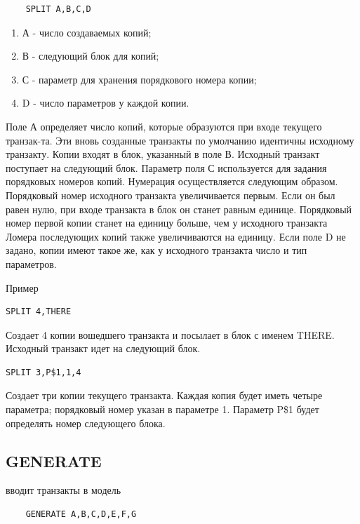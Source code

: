 \documentclass[14pt]{extarticle}
\begin{document}
\begin{lstlisting}
	SPLIT A,B,C,D
\end{lstlisting}

\begin{enumerate}
	\item А - число создаваемых копий;
	\item В - следующий блок для копий;
	\item С - параметр для хранения порядкового номера копии;
	\item D - число параметров у каждой копии.
\end{enumerate}

Поле А определяет число копий, которые образуются при входе текущего транзак-та. Эти вновь созданные транзакты по умолчанию идентичны исходному транзакту. Копии входят в блок, указанный в поле В. Исходный транзакт поступает на следующий блок. Параметр поля С используется для задания порядковых номеров копий. Нумерация осуществляется следующим образом. Порядковый номер исходного транзакта увеличивается первым. Если он был равен нулю, при входе транзакта в блок он станет равным единице. Порядковый номер первой копии станет на единицу больше, чем у исходного транзакта Ломера последующих копий также увеличиваются на единицу. Если поле D не задано, копии имеют такое же, как у исходного транзакта число и тип параметров.

Пример

\begin{lstlisting}
SPLIT 4,THERE
\end{lstlisting}

Создает 4 копии вошедшего транзакта и посылает в блок с именем THERE. Исходный транзакт идет на следующий блок.

\begin{lstlisting}
SPLIT 3,Р$1,1,4
\end{lstlisting}

Создает три копии текущего транзакта. Каждая копия будет иметь четыре параметра; порядковый номер указан в параметре 1. Параметр P\$1 будет определять номер следующего блока.

\subsection*{GENERATE}

вводит транзакты в модель

\begin{lstlisting}
	GENERATE A,B,C,D,E,F,G
\end{lstlisting}
\end{document}
